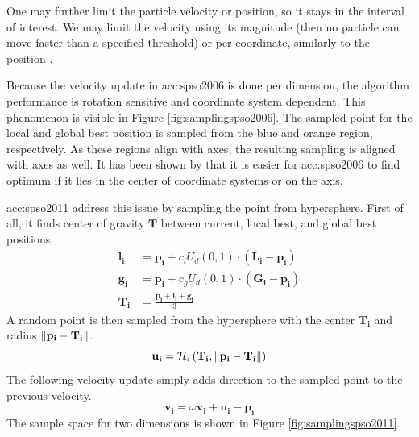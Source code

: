 One may further limit the particle velocity or position, so it stays in the interval of interest. We may limit the velocity using its magnitude (then no particle can move faster than a specified threshold) or per coordinate, similarly to the position \citep{PSOvelocitylimit}.

Because the velocity update in \acrshort{acc:spso2006} is done per dimension, the algorithm performance is rotation sensitive and coordinate system dependent. This phenomenon is visible in Figure \ref{fig:samplingspso2006}. The sampled point for the local and global best position is sampled from the blue and orange region, respectively. As these regions align with axes, the resulting sampling is aligned with axes as well. It has been shown by \citet{psobiasinzero} that it is easier for \acrshort{acc:spso2006} to find optimum if it lies in the center of coordinate systems or on the axis.

\acrshort{acc:spso2011} address this issue by sampling the point from hypersphere. First of all, it finds center of gravity $\mathbf{T}$ between current, local best, and global best positions.
\begin{align*}
    \mathbf{l_i} &= \mathbf{p_i} + c_l U_d\left( 0,1 \right) \cdot \left( \mathbf{L_i} - \mathbf{p_i} \right) \\
    \mathbf{g_i} &= \mathbf{p_i} + c_g U_d\left( 0,1 \right) \cdot \left( \mathbf{G_i} - \mathbf{p_i} \right) \\
    \mathbf{T_i} &= \frac{\mathbf{p_i}+\mathbf{l_i}+\mathbf{g_i}}{3}
\end{align*}
A random point is then sampled from the hypersphere with the center $\mathbf{T_i}$ and radius $\left\lVert\mathbf{p_i} - \mathbf{T_i}\right\rVert$.
$$
\mathbf{u_i} = \mathcal{H}_i\left(\mathbf{T_i}, \left\lVert\mathbf{p_i} - \mathbf{T_i}\right\rVert\right)
$$
The following velocity update simply adds direction to the sampled point to the previous velocity.
$$
\mathbf{v_i} = \omega\mathbf{v_i}+\mathbf{u_i}-\mathbf{p_i}
$$
The sample space for two dimensions is shown in Figure \ref{fig:samplingspso2011}.
